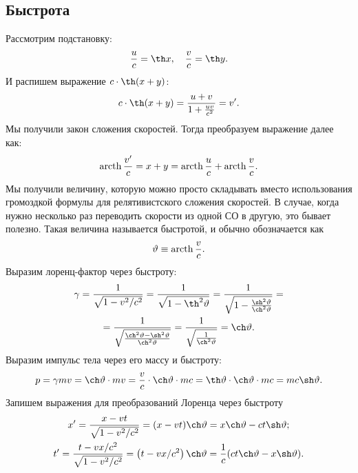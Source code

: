 \subsection{Быстрота}
Рассмотрим подстановку:
\begin{equation}
	\frac{u}{c} = \th x, \quad \frac{v}{c} = \th y.
\end{equation}
И распишем выражение $c \cdot \th (x+y)$:
\begin{equation*}
	c \cdot \th (x+y) 
	   = \frac{u+v}{1+\frac{u v}{c^2}} 
	   = v'.
\end{equation*}
Мы получили закон сложения скоростей. Тогда преобразуем выражение далее как:
\begin{equation*}
    \operatorname{arcth} \frac{v'}{c} 
        = x + y 
        = \operatorname{arcth} \frac{u}{c} +\operatorname{arcth} \frac{v}{c}.
\end{equation*}
Мы получили величину, которую можно просто складывать вместо использования громоздкой формулы для релятивистского сложения скоростей. В случае, когда нужно несколько раз переводить скорости из одной СО в другую, это бывает полезно. Такая величина называется быстротой, и обычно обозначается как
\begin{equation*}
	\vartheta \equiv \operatorname{arcth} \frac{v}{c}.
\end{equation*}
Выразим лоренц-фактор через быстроту:
\begin{multline}
	\gamma
	   = \frac{1}{\sqrt{1 - v^2 / c^2}}
	   = \frac{1}{\sqrt{1 - \th^2 \vartheta}}
	   = \frac{1}{\sqrt{1-\frac{\sh^2 \vartheta}{\ch^2 \vartheta}}} = \\
	   = \frac{1}{\sqrt{\frac{\ch^2 \vartheta - \sh^2 \vartheta}{\ch^2 \vartheta}}}
	   = \frac{1}{\sqrt{\frac{1}{\ch^2 \vartheta}}}
	   =\ch \vartheta.
\end{multline}
Выразим импульс тела через его массу и быстроту:
\begin{equation}
    p 
        = \gamma m v
        = \ch \vartheta \cdot m v 
        = \frac{v}{c} \cdot \ch \vartheta \cdot m c
        = \th \vartheta \cdot \ch \vartheta \cdot m c
        = m c \sh \vartheta.
\end{equation}
Запишем выражения для преобразований Лоренца через быстроту
\begin{gather*}
    x' 
        = \frac{x - v t}{\sqrt{1 - v^2 / c^2}}
        = (x - v t) \ch \vartheta
        = x \ch \vartheta - c t \sh \vartheta; \\
    t' 
        = \frac{t - v x / c^2}{\sqrt{1 - v^2 / c^2}}
        = \left( t - v x / c^2 \right) \ch \vartheta
        = \frac{1}{c}(c t \ch \vartheta - x \sh \vartheta).
\end{gather*}
